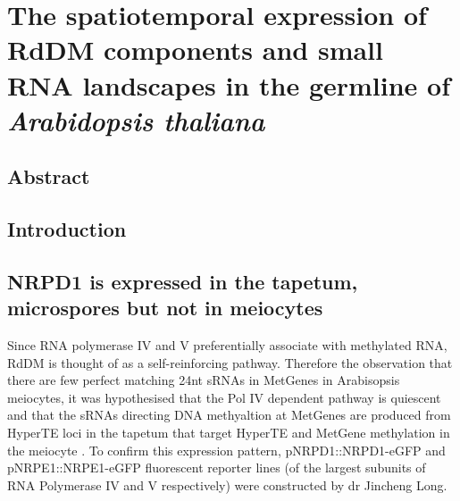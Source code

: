 
\chapter{The spatiotemporal expression of RdDM components and small RNA landscapes in the germline of \textit{Arabidopsis thaliana}}

\ifpdf
    \graphicspath{{Chapter2/Figs/Raster/}{Chapter2/Figs/PDF/}{Chapter2/Figs/}}
\else
    \graphicspath{{Chapter2/Figs/Vector/}{Chapter2/Figs/}}
\fi


\section{Abstract}



\section{Introduction}

\clearpage



\section{NRPD1 is expressed in the tapetum, microspores but not in meiocytes}

Since RNA polymerase IV and V preferentially associate with methylated RNA, RdDM is thought of as a self-reinforcing pathway. Therefore the observation that there are few perfect matching 24nt sRNAs in MetGenes in Arabisopsis meiocytes, it was hypothesised that the Pol IV dependent pathway is quiescent and that the sRNAs directing DNA methyaltion at MetGenes are produced from HyperTE loci in the tapetum that target HyperTE and MetGene methylation in the meiocyte \citep{RN199,RN187}. To confirm this expression pattern, pNRPD1::NRPD1-eGFP and pNRPE1::NRPE1-eGFP fluorescent reporter lines (of the largest subunits of RNA Polymerase IV and V respectively\citep{RN33}) were constructed by dr Jincheng Long.

